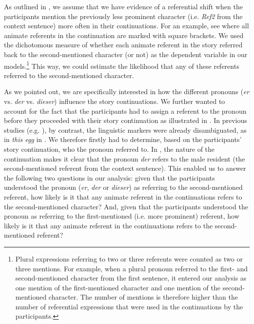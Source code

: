 \documentclass[output=paper,colorlinks,citecolor=brown]{langscibook}
\begin{document}
As outlined in , we assume that we have evidence of a referential shift when the participants mention the previously less prominent character (i.e. \textit{Ref2} from the context sentence) more often in their continuations. For an example, see  where all animate referents in the continuation are marked with square brackets. We used the dichotomous measure of whether each animate referent in the story referred back to the second-mentioned character (or not) as the dependent variable in our models.\footnote{Plural expressions referring to two or three referents were counted as two or three mentions. For example, when a plural pronoun referred to the first- and second-mentioned character from the first sentence, it entered our analysis as one mention of the first-mentioned character and one mention of the second-mentioned character. The number of mentions is therefore higher than the number of referential expressions that were used in the continuations by the participants.} This way, we could estimate the likelihood that any of these referents referred to the second-mentioned character. 

As we pointed out, we are specifically interested in how the different pronouns (\textit{er} vs. \textit{der} vs. \textit{dieser}) influence the story continuations. We further wanted to account for the fact that the participants had to assign a referent to the pronoun before they proceeded with their story continuation as illustrated in . In previous studies (e.g. \citealt{GernsbacherShroyer1989}), by contrast, the linguistic markers were already disambiguated, as in \textit{this egg} in . We therefore firstly had to determine, based on the participants’ story continuation, who the pronoun referred to. In , the nature of the continuation makes it clear that the pronoun \textit{der} refers to the male resident (the second-mentioned referent from the context sentence). This enabled us to answer the following two questions in our analysis: given that the participants understood the pronoun (\textit{er}, \textit{der} or \textit{dieser}) as referring to the second-mentioned referent, how likely is it that any animate referent in the continuations refers to the second-mentioned character? And, given that the participants understood the pronoun as referring to the first-mentioned (i.e. more prominent) referent, how likely is it that any animate referent in the continuations refers to the second-mentioned referent?
\end{document}
